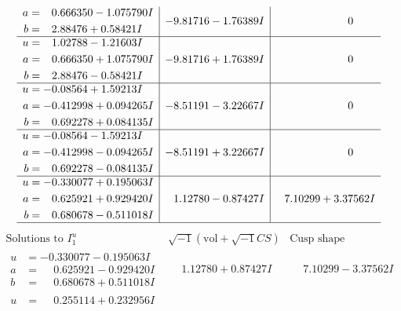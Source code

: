 \documentclass[1p]{elsarticle_modified}
\theoremstyle{definition}
\newcommand{\I}{\sqrt{-1}}
\begin{document}
$$\begin{array}{c|c|c}
\begin{aligned}
a &= \phantom{-}0.666350 - 1.075790 I \\
b &= \phantom{-}2.88476 + 0.58421 I\end{aligned}
 & -9.81716 - 1.76389 I & \phantom{-0.000000 } 0 \\ \hline\begin{aligned}
u &= \phantom{-}1.02788 - 1.21603 I \\
a &= \phantom{-}0.666350 + 1.075790 I \\
b &= \phantom{-}2.88476 - 0.58421 I\end{aligned}
 & -9.81716 + 1.76389 I & \phantom{-0.000000 } 0 \\ \hline\begin{aligned}
u &= -0.08564 + 1.59213 I \\
a &= -0.412998 + 0.094265 I \\
b &= \phantom{-}0.692278 + 0.084135 I\end{aligned}
 & -8.51191 - 3.22667 I & \phantom{-0.000000 } 0 \\ \hline\begin{aligned}
u &= -0.08564 - 1.59213 I \\
a &= -0.412998 - 0.094265 I \\
b &= \phantom{-}0.692278 - 0.084135 I\end{aligned}
 & -8.51191 + 3.22667 I & \phantom{-0.000000 } 0 \\ \hline\begin{aligned}
u &= -0.330077 + 0.195063 I \\
a &= \phantom{-}0.625921 + 0.929420 I \\
b &= \phantom{-}0.680678 - 0.511018 I\end{aligned}
 & \phantom{-}1.12780 - 0.87427 I & \phantom{-}7.10299 + 3.37562 I\\
 \hline 
 \end{array}$$\newpage$$\begin{array}{c|c|c}  
\text{Solutions to }I^u_{1}& \I (\text{vol} + \sqrt{-1}CS) & \text{Cusp shape}\\
 \hline 
\begin{aligned}
u &= -0.330077 - 0.195063 I \\
a &= \phantom{-}0.625921 - 0.929420 I \\
b &= \phantom{-}0.680678 + 0.511018 I\end{aligned}
 & \phantom{-}1.12780 + 0.87427 I & \phantom{-}7.10299 - 3.37562 I \\ \hline\begin{aligned}
u &= \phantom{-}0.255114 + 0.232956 I \\

\end{aligned}
\end{array}$$
\end{document}
